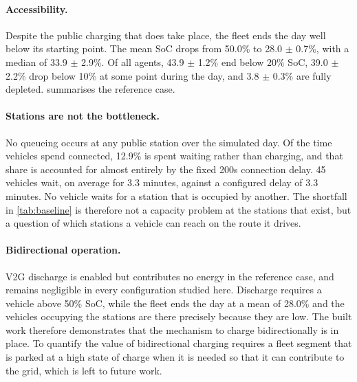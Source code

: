\paragraph{Accessibility.} Despite the public charging that does take place, the fleet ends the day well below its starting point. The mean \ac{SoC} drops from 50.0\% to 28.0 $\pm$ 0.7\%, with a median of 33.9 $\pm$ 2.9\%. Of all agents, 43.9 $\pm$ 1.2\% end below 20\% \ac{SoC}, 39.0 $\pm$ 2.2\% drop below 10\% at some point during the day, and 3.8 $\pm$ 0.3\% are fully depleted.  summarises the reference case.

\paragraph{Stations are not the bottleneck.} No queueing occurs at any public station over the simulated day. Of the time vehicles spend connected, 12.9\% is spent waiting rather than charging, and that share is accounted for almost entirely by the fixed 200s connection delay. 45 vehicles wait, on average for 3.3 minutes, against a configured delay of 3.3 minutes. No vehicle waits for a station that is occupied by another. The shortfall in \cref{tab:baseline} is therefore not a capacity problem at the stations that exist, but a question of which stations a vehicle can reach on the route it drives.

\paragraph{Bidirectional operation.} \ac{V2G} discharge is enabled but contributes no energy in the reference case, and remains negligible in every configuration studied here. Discharge requires a vehicle above 50\% \ac{SoC}, while the fleet ends the day at a mean of 28.0\% and the vehicles occupying the stations are there precisely because they are low. The built work therefore demonstrates that the mechanism to charge bidirectionally is in place. To quantify the value of bidirectional charging requires a fleet segment that is parked at a high state of charge when it is needed so that it can contribute to the grid, which is left to future work.

